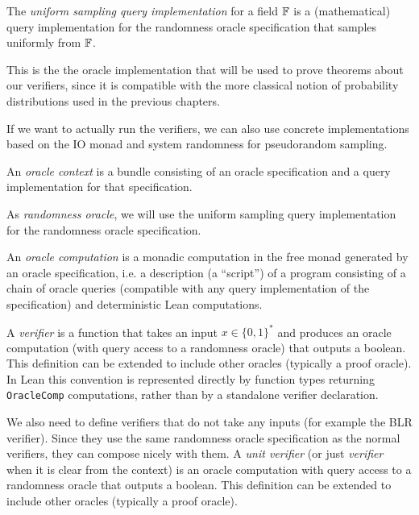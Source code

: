 \begin{definition}
\label{uniformSample}
\leanok
The \emph{uniform sampling query implementation} for a field \(\mathbb{F}\) is a (mathematical) 
query implementation for the randomness oracle specification that samples uniformly from \(\mathbb{F}\).
\end{definition}
This is the the oracle implementation that will be used to prove theorems about our verifiers,
since it is compatible with the more classical notion of probability distributions used in the previous chapters.
\begin{remark}
If we want to actually run the verifiers, we can also use concrete implementations based on the IO monad
and system randomness for pseudorandom sampling.
\end{remark}
\begin{definition}
\label{OracleContext}
\leanok
An \emph{oracle context} is a bundle consisting of an oracle specification and a query implementation for that specification.
\end{definition}
\begin{definition}
\label{randOracle}
 \leanok
As \emph{randomness oracle}, we will use the {uniform sampling query implementation} for the randomness oracle specification.
\end{definition}
\begin{definition}
\label{OracleComp}
\leanok
An \emph{oracle computation} is a monadic computation in the free monad generated by an oracle specification,
i.e. a description (a ``script'') of a program consisting of a chain of oracle queries (compatible with any query implementation of the specification)
and deterministic Lean computations.
\end{definition}

A \emph{verifier} is a function that takes an input \(x \in \{0,1\}^*\) and produces an oracle computation
(with query access to a randomness oracle) that outputs a boolean. This definition can be extended to include
other oracles (typically a proof oracle). In Lean this convention is represented directly by function types returning
\texttt{OracleComp} computations, rather than by a standalone verifier declaration.

We also need to define verifiers that do not take any inputs (for example the BLR verifier).
Since they use the same randomness oracle specification as the normal verifiers, they can
compose nicely with them.
A \emph{unit verifier} (or just \emph{verifier} when it is clear from the context) is an oracle computation with query access to a randomness oracle that outputs a boolean.
This definition can be extended to include
other oracles (typically a proof oracle).

